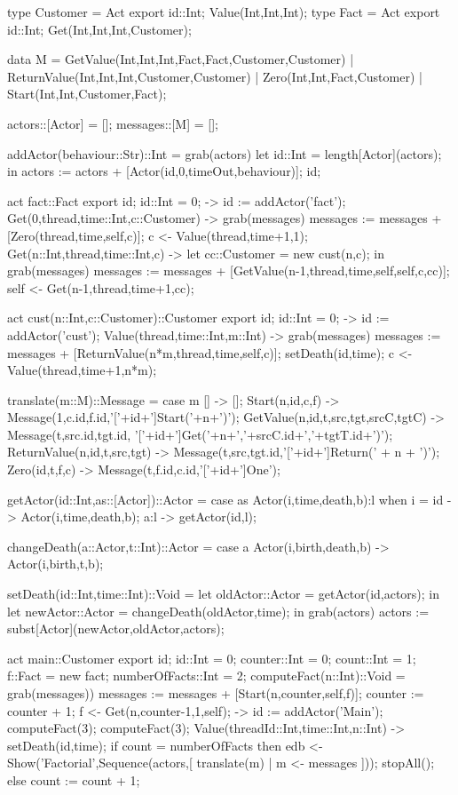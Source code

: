 \documentclass[5p,times]{elsarticle}
\begin{document}
\begin{ESL}
type Customer = Act { export id::Int; Value(Int,Int,Int);}
type Fact = Act{ export id::Int; Get(Int,Int,Int,Customer);}

data M =
  GetValue(Int,Int,Int,Fact,Fact,Customer,Customer)
| ReturnValue(Int,Int,Int,Customer,Customer)
| Zero(Int,Int,Fact,Customer)
| Start(Int,Int,Customer,Fact);

actors::[Actor] = [];
messages::[M] = [];

addActor(behaviour::Str)::Int =
  grab(actors) {
    let id::Int = length[Actor](actors);
    in {
      actors := actors + [Actor(id,0,timeOut,behaviour)];
      id;
    }
  }
  
act fact::Fact {
  export id;
  id::Int = 0;
  -> id := addActor('fact');
  Get(0,thread,time::Int,c::Customer) -> grab(messages) {
    messages := messages + [Zero(thread,time,self,c)];
    c <- Value(thread,time+1,1);
  }
  Get(n::Int,thread,time::Int,c) -> {
    let cc::Customer = new cust(n,c);
    in grab(messages) {
      messages := messages + 
        [GetValue(n-1,thread,time,self,self,c,cc)];
      self <- Get(n-1,thread,time+1,cc);
    }
  }
}

act cust(n::Int,c::Customer)::Customer {
  export id;
  id::Int = 0;
  -> id := addActor('cust');
  Value(thread,time::Int,m::Int) -> grab(messages) {
    messages := messages + 
      [ReturnValue(n*m,thread,time,self,c)];
    setDeath(id,time);
    c <- Value(thread,time+1,n*m);
  }
}

translate(m::M)::Message =
  case m {
    [] -> [];
    Start(n,id,c,f) -> 
      Message(1,c.id,f.id,'['+id+']Start('+n+')');
    GetValue(n,id,t,src,tgt,srcC,tgtC) -> 
      Message(t,src.id,tgt.id,
        '['+id+']Get('+n+','+srcC.id+','+tgtT.id+')');
    ReturnValue(n,id,t,src,tgt) -> 
      Message(t,src,tgt.id,'['+id+']Return(' + n + ')');
    Zero(id,t,f,c) -> 
      Message(t,f.id,c.id,'['+id+']One');
  }
  
getActor(id::Int,as::[Actor])::Actor =
  case as {
    Actor(i,time,death,b):l when i = id -> 
      Actor(i,time,death,b);
    a:l -> getActor(id,l);
  }
  
changeDeath(a::Actor,t::Int)::Actor =
  case a {
    Actor(i,birth,death,b) ->  Actor(i,birth,t,b);
  }
  
setDeath(id::Int,time::Int)::Void =
  let oldActor::Actor = getActor(id,actors); in
  let newActor::Actor = changeDeath(oldActor,time);
  in grab(actors) {
   actors := subst[Actor](newActor,oldActor,actors);
  }

act main::Customer {
  export id;
  id::Int = 0;
  counter::Int = 0;
  count::Int = 1;
  f::Fact = new fact;
  numberOfFacts::Int = 2;
  computeFact(n::Int)::Void = grab(messages)) {
    messages := messages + [Start(n,counter,self,f)];
    counter := counter + 1;
    f <- Get(n,counter-1,1,self);
  }
  -> {
    id := addActor('Main');
    computeFact(3);
    computeFact(3);
  }
  Value(threadId::Int,time::Int,n::Int) -> {
    setDeath(id,time);
    if count = numberOfFacts
    then {
      edb <- Show('Factorial',Sequence(actors,[ 
        translate(m) | m <- messages 
      ]));
      stopAll();
    } else count := count + 1;
  }
}

\end{ESL}
\end{document}
